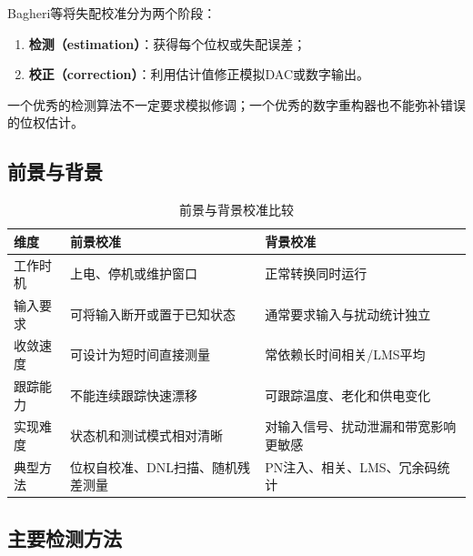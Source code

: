 \documentclass[UTF8,a4paper,11pt]{ctexart}
\begin{document}
Bagheri等将失配校准分为两个阶段：\cite{bagheri2020}
\begin{enumerate}
  \item \textbf{检测（estimation）}：获得每个位权或失配误差；
  \item \textbf{校正（correction）}：利用估计值修正模拟DAC或数字输出。
\end{enumerate}
一个优秀的检测算法不一定要求模拟修调；一个优秀的数字重构器也不能弥补错误的位权估计。

\subsection{前景与背景}

\begin{table}[H]
\centering
\caption{前景与背景校准比较}
\begin{tabularx}{\textwidth}{p{2.4cm}XX}
\toprule
维度 & 前景校准 & 背景校准\\
\midrule
工作时机 & 上电、停机或维护窗口 & 正常转换同时运行\\
输入要求 & 可将输入断开或置于已知状态 & 通常要求输入与扰动统计独立\\
收敛速度 & 可设计为短时间直接测量 & 常依赖长时间相关/LMS平均\\
跟踪能力 & 不能连续跟踪快速漂移 & 可跟踪温度、老化和供电变化\\
实现难度 & 状态机和测试模式相对清晰 & 对输入信号、扰动泄漏和带宽影响更敏感\\
典型方法 & 位权自校准、DNL扫描、随机残差测量 & PN注入、相关、LMS、冗余码统计\\
\bottomrule
\end{tabularx}
\end{table}

\subsection{主要检测方法}
\end{document}
